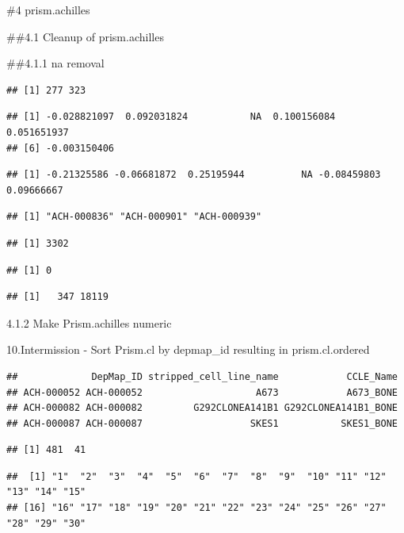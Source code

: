 \documentclass[
]{article}
\begin{document}
\#4 prism.achilles

\#\#4.1 Cleanup of prism.achilles

\#\#4.1.1 na removal

\begin{verbatim}
## [1] 277 323
\end{verbatim}

\begin{verbatim}
## [1] -0.028821097  0.092031824           NA  0.100156084  0.051651937
## [6] -0.003150406
\end{verbatim}

\begin{verbatim}
## [1] -0.21325586 -0.06681872  0.25195944          NA -0.08459803  0.09666667
\end{verbatim}

\begin{verbatim}
## [1] "ACH-000836" "ACH-000901" "ACH-000939"
\end{verbatim}

\begin{verbatim}
## [1] 3302
\end{verbatim}

\begin{verbatim}
## [1] 0
\end{verbatim}

\begin{verbatim}
## [1]   347 18119
\end{verbatim}

4.1.2 Make Prism.achilles numeric

10.Intermission - Sort Prism.cl by depmap\_id resulting in
prism.cl.ordered

\begin{verbatim}
##             DepMap_ID stripped_cell_line_name            CCLE_Name
## ACH-000052 ACH-000052                    A673            A673_BONE
## ACH-000082 ACH-000082         G292CLONEA141B1 G292CLONEA141B1_BONE
## ACH-000087 ACH-000087                   SKES1           SKES1_BONE
\end{verbatim}

\begin{verbatim}
## [1] 481  41
\end{verbatim}

\begin{verbatim}
##  [1] "1"  "2"  "3"  "4"  "5"  "6"  "7"  "8"  "9"  "10" "11" "12" "13" "14" "15"
## [16] "16" "17" "18" "19" "20" "21" "22" "23" "24" "25" "26" "27" "28" "29" "30"
\end{verbatim}
\end{document}
